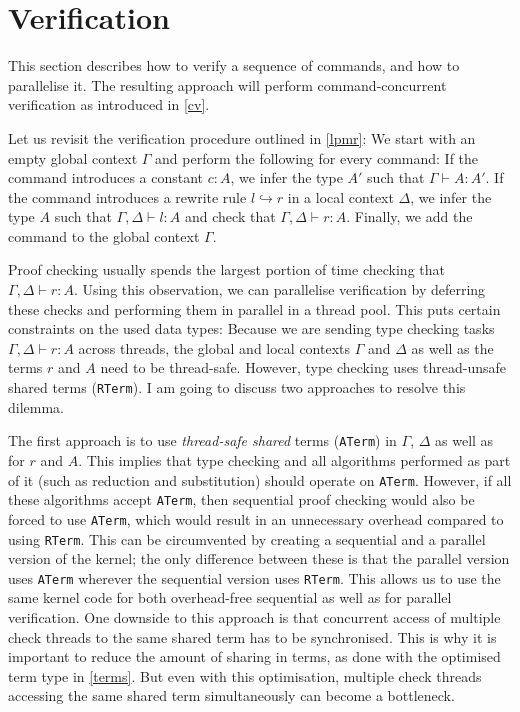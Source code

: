 \documentclass[screen,sigplan,10pt]{acmart}
\begin{document}
\hypertarget{verification}{%
\section{Verification}\label{verification}}

This section describes how to verify a sequence of commands, and how to
parallelise it. The resulting approach will perform command-concurrent
verification as introduced in \autoref{cv}.

Let us revisit the verification procedure outlined in \autoref{lpmr}: We
start with an empty global context \(\Gamma\) and perform the following
for every command: If the command introduces a constant \(c: A\), we
infer the type \(A'\) such that \(\Gamma \vdash A : A'\). If the command
introduces a rewrite rule \(l \hookrightarrow r\) in a local context
\(\Delta\), we infer the type \(A\) such that
\(\Gamma, \Delta \vdash l : A\) and check that
\(\Gamma, \Delta \vdash r : A\). Finally, we add the command to the
global context \(\Gamma\).

Proof checking usually spends the largest portion of time checking that
\(\Gamma, \Delta \vdash r : A\). Using this observation, we can
parallelise verification by deferring these checks and performing them
in parallel in a thread pool. This puts certain constraints on the used
data types: Because we are sending type checking tasks
\(\Gamma, \Delta \vdash r : A\) across threads, the global and local
contexts \(\Gamma\) and \(\Delta\) as well as the terms \(r\) and \(A\)
need to be thread-safe. However, type checking uses thread-unsafe shared
terms (\texttt{RTerm}). I am going to discuss two approaches to resolve
this dilemma.

The first approach is to use \emph{thread-safe shared} terms
(\texttt{ATerm}) in \(\Gamma\), \(\Delta\) as well as for \(r\) and
\(A\). This implies that type checking and all algorithms performed as
part of it (such as reduction and substitution) should operate on
\texttt{ATerm}. However, if all these algorithms accept \texttt{ATerm},
then sequential proof checking would also be forced to use
\texttt{ATerm}, which would result in an unnecessary overhead compared
to using \texttt{RTerm}. This can be circumvented by creating a
sequential and a parallel version of the kernel; the only difference
between these is that the parallel version uses \texttt{ATerm} wherever
the sequential version uses \texttt{RTerm}. This allows us to use the
same kernel code for both overhead-free sequential as well as for
parallel verification. One downside to this approach is that concurrent
access of multiple check threads to the same shared term has to be
synchronised. This is why it is important to reduce the amount of
sharing in terms, as done with the optimised term type in
\autoref{terms}. But even with this optimisation, multiple check threads
accessing the same shared term simultaneously can become a bottleneck.
\end{document}
